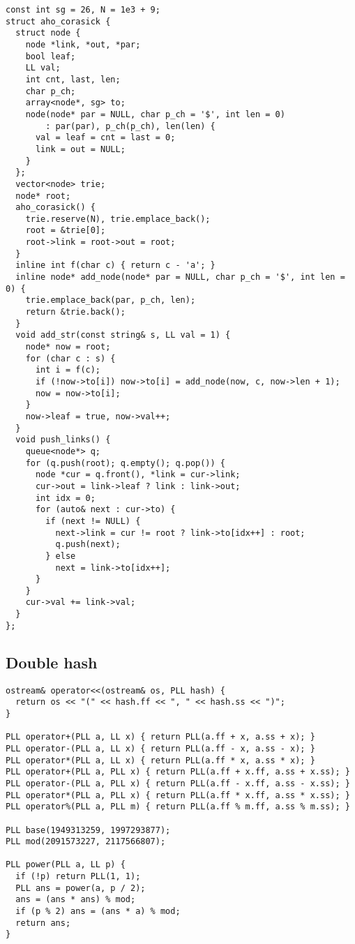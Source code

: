 \documentclass[FSZ,a4paper,onesided]{article}
\begin{document}
\begin{multicols*}{\COLS}
\begin{lstlisting}
const int sg = 26, N = 1e3 + 9;
struct aho_corasick {
  struct node {
    node *link, *out, *par;
    bool leaf;
    LL val;
    int cnt, last, len;
    char p_ch;
    array<node*, sg> to;
    node(node* par = NULL, char p_ch = '$', int len = 0)
        : par(par), p_ch(p_ch), len(len) {
      val = leaf = cnt = last = 0;
      link = out = NULL;
    }
  };
  vector<node> trie;
  node* root;
  aho_corasick() {
    trie.reserve(N), trie.emplace_back();
    root = &trie[0];
    root->link = root->out = root;
  }
  inline int f(char c) { return c - 'a'; }
  inline node* add_node(node* par = NULL, char p_ch = '$', int len = 0) {
    trie.emplace_back(par, p_ch, len);
    return &trie.back();
  }
  void add_str(const string& s, LL val = 1) {
    node* now = root;
    for (char c : s) {
      int i = f(c);
      if (!now->to[i]) now->to[i] = add_node(now, c, now->len + 1);
      now = now->to[i];
    }
    now->leaf = true, now->val++;
  }
  void push_links() {
    queue<node*> q;
    for (q.push(root); q.empty(); q.pop()) {
      node *cur = q.front(), *link = cur->link;
      cur->out = link->leaf ? link : link->out;
      int idx = 0;
      for (auto& next : cur->to) {
        if (next != NULL) {
          next->link = cur != root ? link->to[idx++] : root;
          q.push(next);
        } else
          next = link->to[idx++];
      }
    }
    cur->val += link->val;
  }
};
\end{lstlisting}
\subsection{Double hash}
\begin{lstlisting}
ostream& operator<<(ostream& os, PLL hash) {
  return os << "(" << hash.ff << ", " << hash.ss << ")";
}

PLL operator+(PLL a, LL x) { return PLL(a.ff + x, a.ss + x); }
PLL operator-(PLL a, LL x) { return PLL(a.ff - x, a.ss - x); }
PLL operator*(PLL a, LL x) { return PLL(a.ff * x, a.ss * x); }
PLL operator+(PLL a, PLL x) { return PLL(a.ff + x.ff, a.ss + x.ss); }
PLL operator-(PLL a, PLL x) { return PLL(a.ff - x.ff, a.ss - x.ss); }
PLL operator*(PLL a, PLL x) { return PLL(a.ff * x.ff, a.ss * x.ss); }
PLL operator%(PLL a, PLL m) { return PLL(a.ff % m.ff, a.ss % m.ss); }

PLL base(1949313259, 1997293877);
PLL mod(2091573227, 2117566807);

PLL power(PLL a, LL p) {
  if (!p) return PLL(1, 1);
  PLL ans = power(a, p / 2);
  ans = (ans * ans) % mod;
  if (p % 2) ans = (ans * a) % mod;
  return ans;
}


\end{lstlisting}
\end{multicols*}
\end{document}
